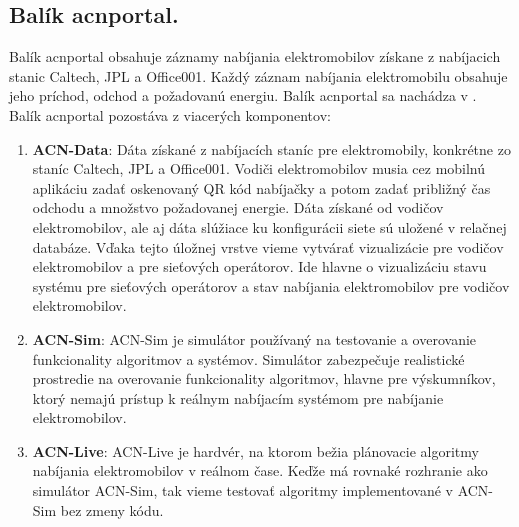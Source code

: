\subsection{Balík acnportal.}
Balík acnportal obsahuje záznamy nabíjania elektromobilov získane z nabíjacich stanic Caltech, JPL a Office001. Každý záznam nabíjania elektromobilu obsahuje jeho príchod, odchod a požadovanú energiu. Balík acnportal sa nachádza v \cite{acnportalrepository}. Balík acnportal pozostáva z viacerých komponentov:

\begin{enumerate}
    \item \textbf{ACN-Data}: Dáta získané z nabíjacích staníc pre elektromobily, konkrétne zo staníc Caltech, JPL a Office001. 
    Vodiči elektromobilov musia cez mobilnú aplikáciu zadať oskenovaný QR kód nabíjačky a potom zadať približný čas odchodu a množstvo požadovanej energie. 
    Dáta získané od vodičov elektromobilov, ale aj dáta slúžiace ku konfigurácii siete sú uložené v relačnej databáze. 
    Vďaka tejto úložnej vrstve vieme vytvárať vizualizácie pre vodičov elektromobilov a pre sieťových operátorov. 
    Ide hlavne o vizualizáciu stavu systému pre sieťových operátorov a stav nabíjania elektromobilov pre vodičov elektromobilov.
    \item \textbf{ACN-Sim}: ACN-Sim je simulátor používaný na testovanie a overovanie funkcionality algoritmov a systémov. Simulátor zabezpečuje realistické prostredie na overovanie funkcionality algoritmov, hlavne pre výskumníkov, ktorý nemajú prístup k reálnym nabíjacím systémom pre nabíjanie elektromobilov.
    \item \textbf{ACN-Live}: ACN-Live je hardvér, na ktorom bežia plánovacie algoritmy nabíjania elektromobilov v reálnom čase. Keďže má rovnaké rozhranie ako simulátor ACN-Sim, tak vieme testovať algoritmy implementované v ACN-Sim bez zmeny kódu. \cite{lee2021acnsim, lee2020adaptive}
\end{enumerate}

